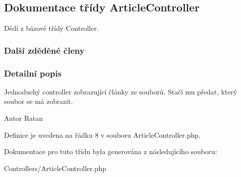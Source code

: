 \hypertarget{class_article_controller}{\subsection{Dokumentace třídy Article\-Controller}
\label{class_article_controller}
}


Dědí z bázové třídy Controller.

\subsubsection*{Další zděděné členy}


\subsubsection{Detailní popis}
Jednoduchý controller zobrazující články ze souborů. Stačí mu předat, který soubor se má zobrazit. \begin{DoxyAuthor}{Autor}
Ratan 
\end{DoxyAuthor}


Definice je uvedena na řádku 8 v souboru Article\-Controller.\-php.



Dokumentace pro tuto třídu byla generována z následujícího souboru\-:\begin{DoxyCompactItemize}
\item 
Controllers/Article\-Controller.\-php\end{DoxyCompactItemize}

